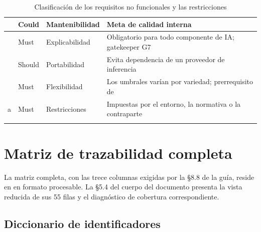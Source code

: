\begin{longtable}{|C{2.0cm}|C{2.0cm}|L{5.0cm}|L{5.4cm}|}
 & Could & Mantenibilidad & Meta de calidad interna \\ \hline
{} & Must & Explicabilidad & Obligatorio para todo componente de IA; gatekeeper G7 \\ \hline
{} & Should & Portabilidad & Evita dependencia de un proveedor de inferencia \\ \hline
{} & Must & Flexibilidad & Los umbrales varían por variedad; prerrequisito de  \\ \hline
{} a  & Must & Restricciones & Impuestas por el entorno, la normativa o la contraparte \\ \hline
\caption{Clasificación de los requisitos no funcionales y las restricciones}
\end{longtable}

\newpage
\section{Matriz de trazabilidad completa}

La matriz completa, con las trece columnas exigidas por la §8.8 de la guía, reside en
\allowbreak{} en formato procesable. La §5.4 del cuerpo del
documento presenta la vista reducida de sus 55 filas y el diagnóstico de cobertura correspondiente.

\subsection{Diccionario de identificadores}

